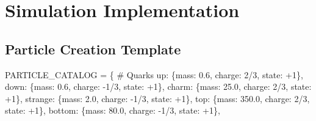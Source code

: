 \documentclass[
  11pt,
  letterpaper,
  twoside,
  openright]{book}
\newenvironment{Shaded}{\begin{snugshade}}{\end{snugshade}}
\newcommand{\CommentTok}[1]{\textcolor[rgb]{0.37,0.37,0.37}{#1}}
\newcommand{\DecValTok}[1]{\textcolor[rgb]{0.68,0.00,0.00}{#1}}
\newcommand{\FloatTok}[1]{\textcolor[rgb]{0.68,0.00,0.00}{#1}}
\newcommand{\NormalTok}[1]{\textcolor[rgb]{0.00,0.23,0.31}{#1}}
\newcommand{\OperatorTok}[1]{\textcolor[rgb]{0.37,0.37,0.37}{#1}}
\newcommand{\StringTok}[1]{\textcolor[rgb]{0.13,0.47,0.30}{#1}}
\begin{document}
\section{Simulation Implementation}\label{simulation-implementation}

\subsection{Particle Creation
Template}\label{particle-creation-template}

\begin{Shaded}
\begin{Highlighting}[]
\NormalTok{PARTICLE\_CATALOG }\OperatorTok{=}\NormalTok{ \{}
    \CommentTok{\# Quarks}
    \StringTok{\textquotesingle{}up\textquotesingle{}}\NormalTok{: \{}\StringTok{\textquotesingle{}mass\textquotesingle{}}\NormalTok{: }\FloatTok{0.6}\NormalTok{, }\StringTok{\textquotesingle{}charge\textquotesingle{}}\NormalTok{: }\DecValTok{2}\OperatorTok{/}\DecValTok{3}\NormalTok{, }\StringTok{\textquotesingle{}state\textquotesingle{}}\NormalTok{: }\OperatorTok{+}\DecValTok{1}\NormalTok{\},}
    \StringTok{\textquotesingle{}down\textquotesingle{}}\NormalTok{: \{}\StringTok{\textquotesingle{}mass\textquotesingle{}}\NormalTok{: }\FloatTok{0.6}\NormalTok{, }\StringTok{\textquotesingle{}charge\textquotesingle{}}\NormalTok{: }\OperatorTok{{-}}\DecValTok{1}\OperatorTok{/}\DecValTok{3}\NormalTok{, }\StringTok{\textquotesingle{}state\textquotesingle{}}\NormalTok{: }\OperatorTok{+}\DecValTok{1}\NormalTok{\},}
    \StringTok{\textquotesingle{}charm\textquotesingle{}}\NormalTok{: \{}\StringTok{\textquotesingle{}mass\textquotesingle{}}\NormalTok{: }\FloatTok{25.0}\NormalTok{, }\StringTok{\textquotesingle{}charge\textquotesingle{}}\NormalTok{: }\DecValTok{2}\OperatorTok{/}\DecValTok{3}\NormalTok{, }\StringTok{\textquotesingle{}state\textquotesingle{}}\NormalTok{: }\OperatorTok{+}\DecValTok{1}\NormalTok{\},}
    \StringTok{\textquotesingle{}strange\textquotesingle{}}\NormalTok{: \{}\StringTok{\textquotesingle{}mass\textquotesingle{}}\NormalTok{: }\FloatTok{2.0}\NormalTok{, }\StringTok{\textquotesingle{}charge\textquotesingle{}}\NormalTok{: }\OperatorTok{{-}}\DecValTok{1}\OperatorTok{/}\DecValTok{3}\NormalTok{, }\StringTok{\textquotesingle{}state\textquotesingle{}}\NormalTok{: }\OperatorTok{+}\DecValTok{1}\NormalTok{\},}
    \StringTok{\textquotesingle{}top\textquotesingle{}}\NormalTok{: \{}\StringTok{\textquotesingle{}mass\textquotesingle{}}\NormalTok{: }\FloatTok{350.0}\NormalTok{, }\StringTok{\textquotesingle{}charge\textquotesingle{}}\NormalTok{: }\DecValTok{2}\OperatorTok{/}\DecValTok{3}\NormalTok{, }\StringTok{\textquotesingle{}state\textquotesingle{}}\NormalTok{: }\OperatorTok{+}\DecValTok{1}\NormalTok{\},}
    \StringTok{\textquotesingle{}bottom\textquotesingle{}}\NormalTok{: \{}\StringTok{\textquotesingle{}mass\textquotesingle{}}\NormalTok{: }\FloatTok{80.0}\NormalTok{, }\StringTok{\textquotesingle{}charge\textquotesingle{}}\NormalTok{: }\OperatorTok{{-}}\DecValTok{1}\OperatorTok{/}\DecValTok{3}\NormalTok{, }\StringTok{\textquotesingle{}state\textquotesingle{}}\NormalTok{: }\OperatorTok{+}\DecValTok{1}\NormalTok{\},}


\end{Highlighting}
\end{Shaded}
\end{document}
